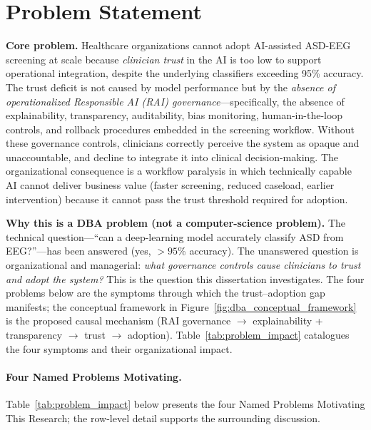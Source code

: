 \section{Problem Statement}
\label{sec:problem_statement}

\noindent\textbf{Core problem.} Healthcare organizations cannot adopt AI-assisted ASD-EEG screening at scale because \emph{clinician trust} in the AI is too low to support operational integration, despite the underlying classifiers exceeding 95\% accuracy. The trust deficit is not caused by model performance but by the \emph{absence of operationalized Responsible AI (RAI) governance}---specifically, the absence of explainability, transparency, auditability, bias monitoring, human-in-the-loop controls, and rollback procedures embedded in the screening workflow. Without these governance controls, clinicians correctly perceive the system as opaque and unaccountable, and decline to integrate it into clinical decision-making. The organizational consequence is a workflow paralysis in which technically capable AI cannot deliver business value (faster screening, reduced caseload, earlier intervention) because it cannot pass the trust threshold required for adoption.

\noindent\textbf{Why this is a DBA problem (not a computer-science problem).} The technical question---``can a deep-learning model accurately classify ASD from EEG?''---has been answered (yes, $>95$\% accuracy). The unanswered question is organizational and managerial: \emph{what governance controls cause clinicians to trust and adopt the system?} This is the question this dissertation investigates. The four problems below are the symptoms through which the trust--adoption gap manifests; the conceptual framework in Figure~\ref{fig:dba_conceptual_framework} is the proposed causal mechanism (RAI governance $\to$ explainability + transparency $\to$ trust $\to$ adoption). Table~\ref{tab:problem_impact} catalogues the four symptoms and their organizational impact.

\paragraph{Four Named Problems Motivating.}



\noindent Table~\ref{tab:problem_impact} below presents the four Named Problems Motivating This Research; the row-level detail supports the surrounding discussion.

